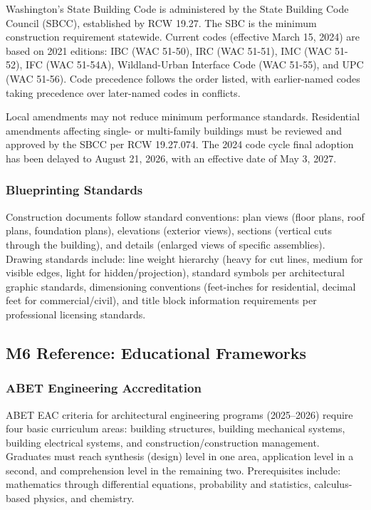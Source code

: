 \documentclass[11pt,letterpaper]{article}
\begin{document}
Washington's State Building Code is administered by the State Building Code Council (SBCC), established by RCW 19.27. The SBC is the minimum construction requirement statewide. Current codes (effective March 15, 2024) are based on 2021 editions: IBC (WAC 51-50), IRC (WAC 51-51), IMC (WAC 51-52), IFC (WAC 51-54A), Wildland-Urban Interface Code (WAC 51-55), and UPC (WAC 51-56). Code precedence follows the order listed, with earlier-named codes taking precedence over later-named codes in conflicts.

Local amendments may not reduce minimum performance standards. Residential amendments affecting single- or multi-family buildings must be reviewed and approved by the SBCC per RCW 19.27.074. The 2024 code cycle final adoption has been delayed to August 21, 2026, with an effective date of May 3, 2027.

\subsubsection{Blueprinting Standards}

Construction documents follow standard conventions: plan views (floor plans, roof plans, foundation plans), elevations (exterior views), sections (vertical cuts through the building), and details (enlarged views of specific assemblies). Drawing standards include: line weight hierarchy (heavy for cut lines, medium for visible edges, light for hidden/projection), standard symbols per architectural graphic standards, dimensioning conventions (feet-inches for residential, decimal feet for commercial/civil), and title block information requirements per professional licensing standards.

\subsection{M6 Reference: Educational Frameworks}

\subsubsection{ABET Engineering Accreditation}

ABET EAC criteria for architectural engineering programs (2025--2026) require four basic curriculum areas: building structures, building mechanical systems, building electrical systems, and construction/construction management. Graduates must reach synthesis (design) level in one area, application level in a second, and comprehension level in the remaining two. Prerequisites include: mathematics through differential equations, probability and statistics, calculus-based physics, and chemistry.
\end{document}
